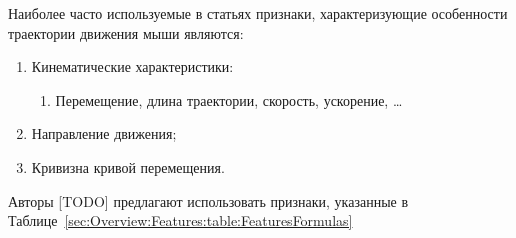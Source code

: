 \documentclass[12pt]{article}
\begin{document}
    \par Наиболее часто используемые в статьях признаки, характеризующие особенности траектории движения мыши являются:
    \begin{enumerate}
        \item Кинематические характеристики:
        \begin{enumerate}
            \item Перемещение, длина траектории, скорость, ускорение, \ldots
        \end{enumerate}
        \item Направление движения;
        \item Кривизна кривой перемещения.
    \end{enumerate}

    \par Авторы [TODO] предлагают использовать признаки, указанные в Таблице~\ref{sec:Overview:Features:table:FeaturesFormulas}
    
\end{document}
